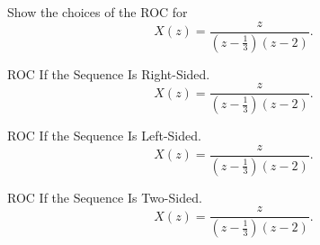 \begin{frame}
    \begin{example}
        Show the choices of the ROC for
        \begin{equation*}
            X(z) = \frac{z}{\left(z - \frac{1}{3}\right)\left(z-2\right)}.
        \end{equation*}
    \end{example}
\end{frame}

\begin{frame}{ROC If the Sequence Is Right-Sided.}
    \begin{equation*}
        X(z) = \frac{z}{\left(z - \frac{1}{3}\right)\left(z-2\right)}.
    \end{equation*}
    {
        \begin{center}
            
        \end{center}
    }
\end{frame}

\begin{frame}{ROC If the Sequence Is Left-Sided.}
    \begin{equation*}
        X(z) = \frac{z}{\left(z - \frac{1}{3}\right)\left(z-2\right)}.
    \end{equation*}
    {
        \begin{center}
            
        \end{center}
    }
\end{frame}

\begin{frame}{ROC If the Sequence Is Two-Sided.}
    \begin{equation*}
        X(z) = \frac{z}{\left(z - \frac{1}{3}\right)\left(z-2\right)}.
    \end{equation*}
    {
        \begin{center}
            
        \end{center}

    }
\end{frame}

